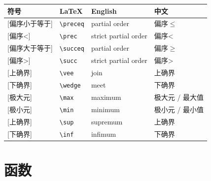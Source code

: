 \documentclass[11pt]{ctexart}
\begin{document}
\begin{longtable}{>{\centering\arraybackslash}m{2cm} m{3.5cm} m{4.5cm} m{4cm}}
\toprule
符号 & LaTeX & English & 中文 \\
\midrule
\syms{$\preceq$}{\verb|\preceq|}[偏序小于等于] & \verb|\preceq| & partial order & 偏序$\le$ \\
\syms{$\prec$}{\verb|\prec|}[偏序<] & \verb|\prec| & strict partial order & 偏序< \\
\syms{$\succeq$}{\verb|\succeq|}[偏序大于等于] & \verb|\succeq| & partial order & 偏序$\ge$ \\
\syms{$\succ$}{\verb|\succ|}[偏序>] & \verb|\succ| & strict partial order & 偏序> \\
\syms{$\vee$}{\verb|\vee|}[上确界] & \verb|\vee| & join & 上确界 \\
\syms{$\wedge$}{\verb|\wedge|}[下确界] & \verb|\wedge| & meet & 下确界 \\
\syms{$\max$}{\verb|\max|}[极大元] & \verb|\max| & maximum & 极大元 / 最大值 \\
\syms{$\min$}{\verb|\min|}[极小元] & \verb|\min| & minimum & 极小元 / 最小值 \\
\syms{$\sup$}{\verb|\sup|}[上确界] & \verb|\sup| & supremum & 上确界 \\
\syms{$\inf$}{\verb|\inf|}[下确界] & \verb|\inf| & infimum & 下确界 \\
\bottomrule
\end{longtable}

\section{函数}\label{sec:functions}
\end{document}
